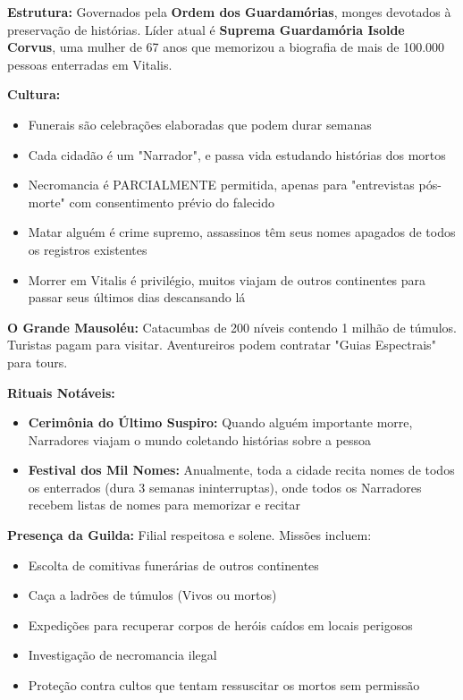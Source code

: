 \textbf{\ringmfamily Estrutura:} Governados pela \textbf{Ordem dos Guardamórias}, monges devotados à preservação de histórias. Líder atual é \textbf{Suprema Guardamória Isolde Corvus}, uma mulher de 67 anos que memorizou a biografia de mais de 100.000 pessoas enterradas em Vitalis.

\textbf{\ringmfamily Cultura:}
\begin{itemize}
    \item Funerais são celebrações elaboradas que podem durar semanas
    \item Cada cidadão é um "Narrador", e passa vida estudando histórias dos mortos
    \item Necromancia é PARCIALMENTE permitida, apenas para "entrevistas pós-morte" com consentimento prévio do falecido
    \item Matar alguém é crime supremo, assassinos têm seus nomes apagados de todos os registros existentes
    \item Morrer em Vitalis é privilégio, muitos viajam de outros continentes para passar seus últimos dias descansando lá
\end{itemize}

\textbf{\ringmfamily O Grande Mausoléu:} Catacumbas de 200 níveis contendo 1 milhão de túmulos. Turistas pagam para visitar. Aventureiros podem contratar "Guias Espectrais" para tours.

\textbf{\ringmfamily Rituais Notáveis:}
\begin{itemize}
    \item \textbf{\ringmfamily Cerimônia do Último Suspiro:} Quando alguém importante morre, Narradores viajam o mundo coletando histórias sobre a pessoa
    \item \textbf{\ringmfamily Festival dos Mil Nomes:} Anualmente, toda a cidade recita nomes de todos os enterrados (dura 3 semanas ininterruptas), onde todos os Narradores recebem listas de nomes para memorizar e recitar
\end{itemize}

\textbf{\ringmfamily Presença da Guilda:} Filial respeitosa e solene. Missões incluem:
\begin{itemize}
    \item Escolta de comitivas funerárias de outros continentes
    \item Caça a ladrões de túmulos (Vivos ou mortos)
    \item Expedições para recuperar corpos de heróis caídos em locais perigosos
    \item Investigação de necromancia ilegal
    \item Proteção contra cultos que tentam ressuscitar os mortos sem permissão
\end{itemize}

